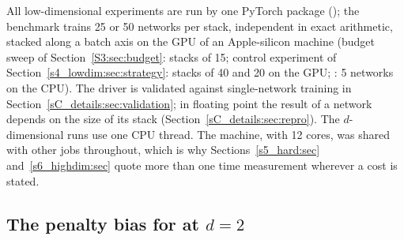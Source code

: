 All low-dimensional experiments are run by one PyTorch package (); the
benchmark trains 25 or 50 networks per stack, independent in exact arithmetic, stacked along
a batch axis on the GPU of an Apple-silicon machine (budget sweep of
Section~\ref{S3:sec:budget}: stacks of 15; control experiment of
Section~\ref{s4_lowdim:sec:strategy}: stacks of 40 and 20 on the GPU; \PLthreeS: 5 networks on
the CPU). The driver is validated against single-network training in
Section~\ref{sC_details:sec:validation}; in floating point the result of a network depends on
the size of its stack (Section~\ref{sC_details:sec:repro}). The $d$-dimensional runs use one
CPU thread. The machine, with 12 cores, was shared with other jobs throughout, which is why
Sections~\ref{s5_hard:sec} and~\ref{s6_highdim:sec} quote more than one time measurement
wherever a cost is stated.

\subsection{The penalty bias for \texorpdfstring{\Pone}{LapD} at \texorpdfstring{$d=2$}{d = 2}}

